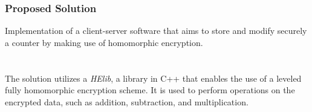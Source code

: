 \documentclass{beamer}
\begin{document}
\begin{frame}
\frametitle{Proposed Solution}

Implementation of a client-server software that aims to store and modify securely a counter by making use of homomorphic encryption.  \\~\\~\\

The solution utilizes a \emph{HElib}, a library in C++ that enables the use of a leveled fully homomorphic encryption scheme. It is used to perform operations on the encrypted data, such as addition, subtraction, and multiplication. \\~\\

\end{frame}
\end{document}
